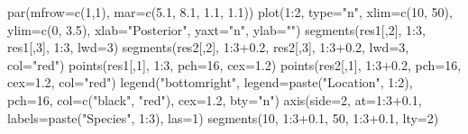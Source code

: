 \documentclass[
  13,
  letterpaper,
]{report}
\newenvironment{Shaded}{\begin{snugshade}}{\end{snugshade}}
\newcommand{\AttributeTok}[1]{\textcolor[rgb]{0.40,0.45,0.13}{#1}}
\newcommand{\DecValTok}[1]{\textcolor[rgb]{0.68,0.00,0.00}{#1}}
\newcommand{\FloatTok}[1]{\textcolor[rgb]{0.68,0.00,0.00}{#1}}
\newcommand{\FunctionTok}[1]{\textcolor[rgb]{0.28,0.35,0.67}{#1}}
\newcommand{\NormalTok}[1]{\textcolor[rgb]{0.00,0.23,0.31}{#1}}
\newcommand{\SpecialCharTok}[1]{\textcolor[rgb]{0.37,0.37,0.37}{#1}}
\newcommand{\StringTok}[1]{\textcolor[rgb]{0.13,0.47,0.30}{#1}}
\begin{document}
\begin{Shaded}
\begin{Highlighting}[]
\FunctionTok{par}\NormalTok{(}\AttributeTok{mfrow=}\FunctionTok{c}\NormalTok{(}\DecValTok{1}\NormalTok{,}\DecValTok{1}\NormalTok{), }\AttributeTok{mar=}\FunctionTok{c}\NormalTok{(}\FloatTok{5.1}\NormalTok{, }\FloatTok{8.1}\NormalTok{, }\FloatTok{1.1}\NormalTok{, }\FloatTok{1.1}\NormalTok{))}
\FunctionTok{plot}\NormalTok{(}\DecValTok{1}\SpecialCharTok{:}\DecValTok{2}\NormalTok{, }\AttributeTok{type=}\StringTok{"n"}\NormalTok{, }\AttributeTok{xlim=}\FunctionTok{c}\NormalTok{(}\DecValTok{10}\NormalTok{, }\DecValTok{50}\NormalTok{),}
    \AttributeTok{ylim=}\FunctionTok{c}\NormalTok{(}\DecValTok{0}\NormalTok{, }\FloatTok{3.5}\NormalTok{), }\AttributeTok{xlab=}\StringTok{"Posterior"}\NormalTok{,}
    \AttributeTok{yaxt=}\StringTok{"n"}\NormalTok{, }\AttributeTok{ylab=}\StringTok{""}\NormalTok{)}
\FunctionTok{segments}\NormalTok{(res1[,}\DecValTok{2}\NormalTok{], }\DecValTok{1}\SpecialCharTok{:}\DecValTok{3}\NormalTok{, res1[,}\DecValTok{3}\NormalTok{], }\DecValTok{1}\SpecialCharTok{:}\DecValTok{3}\NormalTok{, }\AttributeTok{lwd=}\DecValTok{3}\NormalTok{)}
\FunctionTok{segments}\NormalTok{(res2[,}\DecValTok{2}\NormalTok{], }\DecValTok{1}\SpecialCharTok{:}\DecValTok{3}\FloatTok{+0.2}\NormalTok{, res2[,}\DecValTok{3}\NormalTok{], }\DecValTok{1}\SpecialCharTok{:}\DecValTok{3}\FloatTok{+0.2}\NormalTok{, }\AttributeTok{lwd=}\DecValTok{3}\NormalTok{, }\AttributeTok{col=}\StringTok{"red"}\NormalTok{)}
\FunctionTok{points}\NormalTok{(res1[,}\DecValTok{1}\NormalTok{], }\DecValTok{1}\SpecialCharTok{:}\DecValTok{3}\NormalTok{, }\AttributeTok{pch=}\DecValTok{16}\NormalTok{, }\AttributeTok{cex=}\FloatTok{1.2}\NormalTok{)}
\FunctionTok{points}\NormalTok{(res2[,}\DecValTok{1}\NormalTok{], }\DecValTok{1}\SpecialCharTok{:}\DecValTok{3}\FloatTok{+0.2}\NormalTok{, }\AttributeTok{pch=}\DecValTok{16}\NormalTok{, }\AttributeTok{cex=}\FloatTok{1.2}\NormalTok{, }\AttributeTok{col=}\StringTok{"red"}\NormalTok{)}
\FunctionTok{legend}\NormalTok{(}\StringTok{"bottomright"}\NormalTok{, }\AttributeTok{legend=}\FunctionTok{paste}\NormalTok{(}\StringTok{"Location"}\NormalTok{, }\DecValTok{1}\SpecialCharTok{:}\DecValTok{2}\NormalTok{),}
    \AttributeTok{pch=}\DecValTok{16}\NormalTok{, }\AttributeTok{col=}\FunctionTok{c}\NormalTok{(}\StringTok{"black"}\NormalTok{, }\StringTok{"red"}\NormalTok{), }\AttributeTok{cex=}\FloatTok{1.2}\NormalTok{, }\AttributeTok{bty=}\StringTok{"n"}\NormalTok{)}
\FunctionTok{axis}\NormalTok{(}\AttributeTok{side=}\DecValTok{2}\NormalTok{, }\AttributeTok{at=}\DecValTok{1}\SpecialCharTok{:}\DecValTok{3}\FloatTok{+0.1}\NormalTok{, }\AttributeTok{labels=}\FunctionTok{paste}\NormalTok{(}\StringTok{"Species"}\NormalTok{, }\DecValTok{1}\SpecialCharTok{:}\DecValTok{3}\NormalTok{), }\AttributeTok{las=}\DecValTok{1}\NormalTok{)}
\FunctionTok{segments}\NormalTok{(}\DecValTok{10}\NormalTok{, }\DecValTok{1}\SpecialCharTok{:}\DecValTok{3}\FloatTok{+0.1}\NormalTok{, }\DecValTok{50}\NormalTok{, }\DecValTok{1}\SpecialCharTok{:}\DecValTok{3}\FloatTok{+0.1}\NormalTok{, }\AttributeTok{lty=}\DecValTok{2}\NormalTok{)}
\end{Highlighting}
\end{Shaded}
\end{document}
